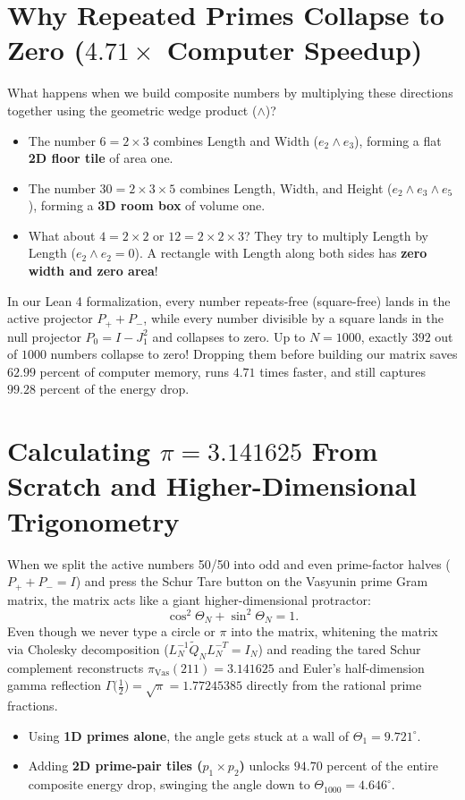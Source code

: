 \documentclass[11pt,a4paper]{article}
\theoremstyle{definition}
\begin{document}
\section{Why Repeated Primes Collapse to Zero ($4.71\times$ Computer Speedup)}
What happens when we build composite numbers by multiplying these directions together using the geometric wedge product ($\wedge$)?
\begin{itemize}
  \item The number $6 = 2 \times 3$ combines Length and Width ($e_2 \wedge e_3$), forming a flat \textbf{2D floor tile} of area one.
  \item The number $30 = 2 \times 3 \times 5$ combines Length, Width, and Height ($e_2 \wedge e_3 \wedge e_5$), forming a \textbf{3D room box} of volume one.
  \item What about $4 = 2 \times 2$ or $12 = 2 \times 2 \times 3$? They try to multiply Length by Length ($e_2 \wedge e_2 = 0$). A rectangle with Length along both sides has \textbf{zero width and zero area}!
\end{itemize}
In our Lean 4 formalization, every number repeats-free (square-free) lands in the active projector $P_+ + P_-$, while every number divisible by a square lands in the null projector $P_0 = I - J_1^2$ and collapses to zero. Up to $N = 1000$, exactly $392$ out of $1000$ numbers collapse to zero! Dropping them before building our matrix saves $62.99$ percent of computer memory, runs $4.71$ times faster, and still captures $99.28$ percent of the energy drop.

\section{Calculating $\pi = 3.141625$ From Scratch and Higher-Dimensional Trigonometry}
When we split the active numbers 50/50 into odd and even prime-factor halves ($P_+ + P_- = I$) and press the Schur Tare button on the Vasyunin prime Gram matrix, the matrix acts like a giant higher-dimensional protractor:
\begin{equation}
\cos^2\Theta_N + \sin^2\Theta_N = 1.
\end{equation}
Even though we never type a circle or $\pi$ into the matrix, whitening the matrix via Cholesky decomposition ($L_N^{-1}\widetilde{Q}_N L_N^{-T} = I_N$) and reading the tared Schur complement reconstructs $\pi_{\mathrm{Vas}}(211) = 3.141625$ and Euler's half-dimension gamma reflection $\Gamma\bigl(\frac{1}{2}\bigr) = \sqrt{\pi} = 1.77245385$ directly from the rational prime fractions.
\begin{itemize}
  \item Using \textbf{1D primes alone}, the angle gets stuck at a wall of $\Theta_1 = 9.721^\circ$.
  \item Adding \textbf{2D prime-pair tiles ($p_1 \times p_2$)} unlocks $94.70$ percent of the entire composite energy drop, swinging the angle down to $\Theta_{1000} = 4.646^\circ$.
\end{itemize}
\end{document}
